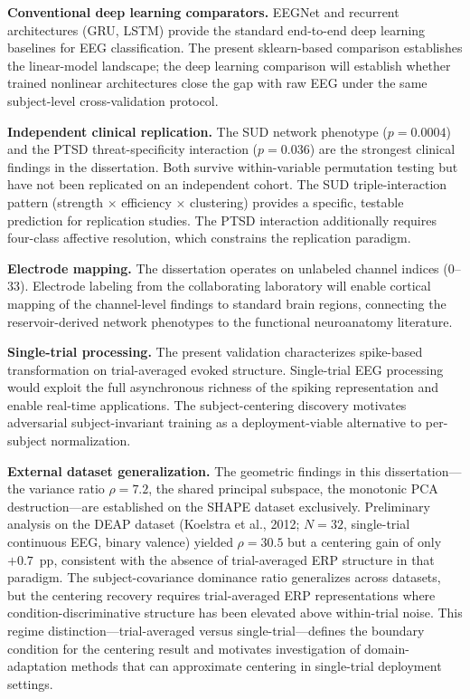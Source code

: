 \textbf{Conventional deep learning comparators.} EEGNet and recurrent architectures (GRU, LSTM) provide the standard end-to-end deep learning baselines for EEG classification. The present sklearn-based comparison establishes the linear-model landscape; the deep learning comparison will establish whether trained nonlinear architectures close the gap with raw EEG under the same subject-level cross-validation protocol.

\textbf{Independent clinical replication.} The SUD network phenotype ($p = 0.0004$) and the PTSD threat-specificity interaction ($p = 0.036$) are the strongest clinical findings in the dissertation. Both survive within-variable permutation testing but have not been replicated on an independent cohort. The SUD triple-interaction pattern (strength $\times$ efficiency $\times$ clustering) provides a specific, testable prediction for replication studies. The PTSD interaction additionally requires four-class affective resolution, which constrains the replication paradigm.

\textbf{Electrode mapping.} The dissertation operates on unlabeled channel indices ($0$--$33$). Electrode labeling from the collaborating laboratory will enable cortical mapping of the channel-level findings to standard brain regions, connecting the reservoir-derived network phenotypes to the functional neuroanatomy literature.

\textbf{Single-trial processing.} The present validation characterizes spike-based transformation on trial-averaged evoked structure. Single-trial EEG processing would exploit the full asynchronous richness of the spiking representation and enable real-time applications. The subject-centering discovery motivates adversarial subject-invariant training as a deployment-viable alternative to per-subject normalization.

\textbf{External dataset generalization.} The geometric findings in this dissertation---the variance ratio $\rho = 7.2$, the shared principal subspace, the monotonic PCA destruction---are established on the SHAPE dataset exclusively. Preliminary analysis on the DEAP dataset (Koelstra et al., 2012; $N = 32$, single-trial continuous EEG, binary valence) yielded $\rho = 30.5$ but a centering gain of only $+0.7$~pp, consistent with the absence of trial-averaged ERP structure in that paradigm. The subject-covariance dominance ratio generalizes across datasets, but the centering recovery requires trial-averaged ERP representations where condition-discriminative structure has been elevated above within-trial noise. This regime distinction---trial-averaged versus single-trial---defines the boundary condition for the centering result and motivates investigation of domain-adaptation methods that can approximate centering in single-trial deployment settings.

